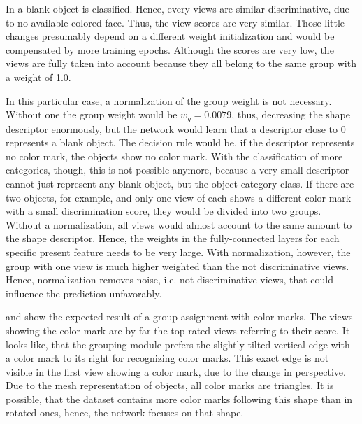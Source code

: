 In  a blank object is classified.
Hence, every views are similar discriminative, due to no available colored face.
Thus, the view scores are very similar.
Those little changes presumably depend on a different weight initialization and would be compensated by more training epochs.
Although the scores are very low, the views are fully taken into account because they all belong to the same group with a weight of 1.0.

In this particular case, a normalization of the group weight is not necessary.
Without one the group weight would be $w_g = 0.0079$, thus, decreasing the shape descriptor enormously, but the network would learn that a descriptor close to 0 represents a blank object.
The decision rule would be, if the descriptor represents no color mark, the objects show no color mark.
With the classification of more categories, though, this is not possible anymore, because a very small descriptor cannot just represent any blank object, but the object category class.
If there are two objects, for example, and only one view of each shows a different color mark with a small discrimination score, they would be divided into two groups.
Without a normalization, all views would almost account to the same amount to the shape descriptor.
Hence, the weights in the fully-connected layers for each specific present feature needs to be very large.
With normalization, however, the group with one view is much higher weighted than the not discriminative views.
Hence, normalization removes noise, i.e. not discriminative views, that could influence the prediction unfavorably.

 and  show the expected result of a group assignment with color marks.
The views showing the color mark are by far the top-rated views referring to their score.
It looks like, that the grouping module prefers the slightly tilted vertical edge with a color mark to its right for recognizing color marks.
This exact edge is not visible in the first view showing a color mark, due to the change in perspective.
Due to the mesh representation of objects, all color marks are triangles.
It is possible, that the dataset contains more color marks following this shape than in rotated ones, hence, the network focuses on that shape.

